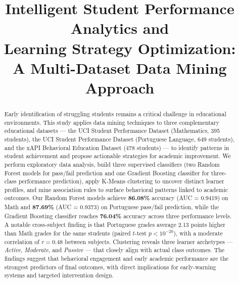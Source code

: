 \documentclass[conference]{IEEEtran}
\begin{document}
\title{Intelligent Student Performance Analytics and\\Learning Strategy Optimization:\\A Multi-Dataset Data Mining Approach}

\author{
}

\maketitle

\begin{abstract}
Early identification of struggling students remains a critical challenge in educational environments. This study applies data mining techniques to three complementary educational datasets — the UCI Student Performance Dataset (Mathematics, 395 students), the UCI Student Performance Dataset (Portuguese Language, 649 students), and the xAPI Behavioral Education Dataset (478 students) — to identify patterns in student achievement and propose actionable strategies for academic improvement. We perform exploratory data analysis, build three supervised classifiers (two Random Forest models for pass/fail prediction and one Gradient Boosting classifier for three-class performance prediction), apply K-Means clustering to uncover distinct learner profiles, and mine association rules to surface behavioral patterns linked to academic outcomes. Our Random Forest models achieve \textbf{86.08\%} accuracy (AUC = 0.9419) on Math and \textbf{87.69\%} (AUC = 0.9373) on Portuguese pass/fail prediction, while the Gradient Boosting classifier reaches \textbf{76.04\%} accuracy across three performance levels. A notable cross-subject finding is that Portuguese grades average 2.13 points higher than Math grades for the same students (paired $t$-test $p < 10^{-20}$), with a moderate correlation of $r = 0.48$ between subjects. Clustering reveals three learner archetypes — \textit{Active}, \textit{Moderate}, and \textit{Passive} — that closely align with actual class outcomes. The findings suggest that behavioral engagement and early academic performance are the strongest predictors of final outcomes, with direct implications for early-warning systems and targeted intervention design.
\end{abstract}
\end{document}
